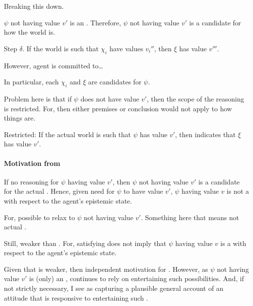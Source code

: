 \begin{note}
  Breaking this down.

  \(\psi\) not having value \(v'\) is an \ep{}.
  Therefore, \(\psi\) not having value \(v'\) is a candidate for how the world is.

  Step \(\delta\).
  If the world is such that \(\chi_{i}\) have values \(v_{i}''\), then \(\xi\) has value \(v'''\).

  However, agent is committed to\dots

  In particular, each \(\chi_{i}\) and \(\xi\) are candidates for \(\psi\).

  Problem here is that if \(\psi\) does not have value \(v'\), then the scope of the reasoning is restricted.
  For, then either premises or conclusion would not apply to how things are.

  Restricted: If the actual world is such that \(\psi\) has value \(v'\), then indicates that \(\xi\) has value \(v'\).
\end{note}

\paragraph{Motivation from \ideaCSA{}}

\begin{note}
  If no reasoning for \(\psi\) having value \(v'\), then \(\psi\) not having value \(v'\) is a candidate for the actual \world{}.
  Hence, given need for \(\psi\) to have value \(v'\), \(\psi\) having value \(v\) is not a \sink{} with respect to the agent's epistemic state.

  For, possible to relax to \(\psi\) not having value \(v'\).
  Something here that means not actual \world{}.
\end{note}

\begin{note}
  Still, weaker than \ideaCSA{}.
  For, satisfying \ideaCSB{} does not imply that \(\psi\) having value \(v\) is a \sink{} with respect to the agent's epistemic state.
\end{note}

\begin{note}
  Given that \ideaCSB{} is weaker, then independent motivation for \ideaCSB{}.
  However, as \(\psi\) not having value \(v'\) is (only) an \epAdv{}, \ideaCSB{} continues to rely on entertaining such possibilities.
  And, if not strictly necessary, I see \ideaCSA{} as capturing a plausible general account of an attitude that is responsive to entertaining such .
\end{note}


